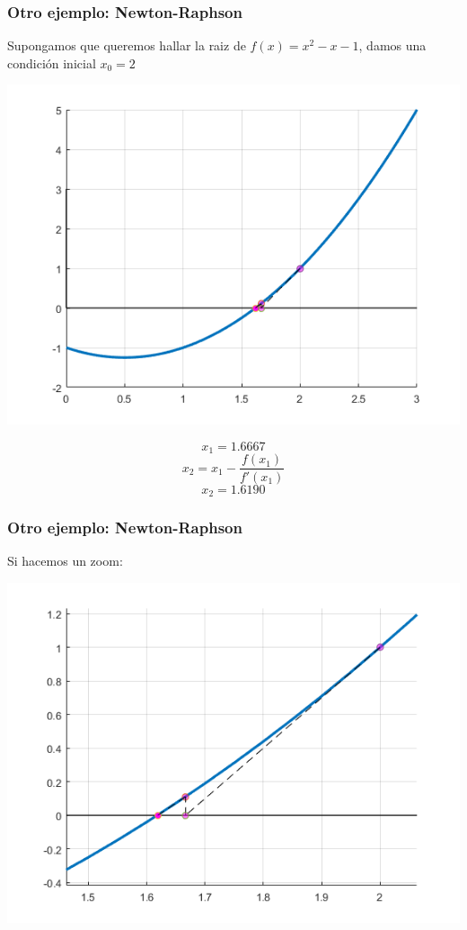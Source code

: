 \documentclass[xcolor=svgnames]{beamer} %
\theoremstyle{plain}
\theoremstyle{definition}
\begin{document}
\begin{frame}
	\frametitle{Otro ejemplo: Newton-Raphson}

Supongamos que queremos hallar la raiz de $f(x) = x^2-x-1$,
damos una condición inicial $x_0=2$


\begin{minipage}{.7\linewidth}
\includegraphics[width=\linewidth]{nr_example2/iter2.png} 

\end{minipage}  \begin{minipage}{.25\linewidth}
$$ x_1 = 1.6667$$
$$ x_2 = x_1 - \frac{f(x_1)}{f'(x_1)}$$
$$ x_2 = 1.6190$$
\end{minipage}

\end{frame}

\begin{frame}
	\frametitle{Otro ejemplo: Newton-Raphson}
Si hacemos un zoom:

\begin{minipage}{.8\linewidth}
\includegraphics[width=\linewidth]{nr_example2/iter2_zoom.png} 
\end{minipage} 
\end{frame}
\end{document}
